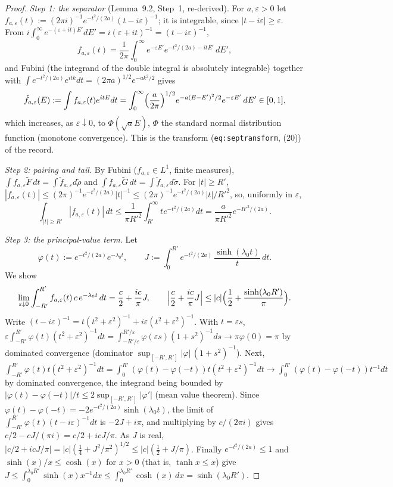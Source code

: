 \documentclass[11pt,a4paper]{article}
\newcommand{\Ft}{\widetilde F}
\newcommand{\Gt}{\widetilde G}
\theoremstyle{plain}
\theoremstyle{definition}
\begin{document}
\begin{proof}
\emph{Step 1: the separator} (Lemma~9.2, Step~1, re-derived).  For $a,\varepsilon>0$ let
$f_{a,\varepsilon}(t):=(2\pi i)^{-1}e^{-t^2/(2a)}(t-i\varepsilon)^{-1}$; it is integrable, since
$|t-i\varepsilon|\ge\varepsilon$.  From $i\int_0^\infty e^{-(\varepsilon+it)E'}dE'=
i(\varepsilon+it)^{-1}=(t-i\varepsilon)^{-1}$,
\[
 f_{a,\varepsilon}(t)=\frac1{2\pi}\int_0^\infty e^{-\varepsilon E'}e^{-t^2/(2a)-itE'}\,dE' ,
\]
and Fubini (the integrand of the double integral is absolutely integrable) together with
$\int e^{-t^2/(2a)}e^{itk}dt=(2\pi a)^{1/2}e^{-ak^2/2}$ gives
\[
 \check f_{a,\varepsilon}(E):=\int f_{a,\varepsilon}(t)e^{itE}dt
 =\int_0^\infty\Bigl(\frac a{2\pi}\Bigr)^{1/2}e^{-a(E-E')^2/2}e^{-\varepsilon E'}\,dE'\in[0,1],
\]
which increases, as $\varepsilon\downarrow0$, to $\Phi(\sqrt aE)$, $\Phi$ the standard normal
distribution function (monotone convergence).  This is the transform (\texttt{eq:septransform},
(20)) of the record.

\emph{Step 2: pairing and tail.}  By Fubini ($f_{a,\varepsilon}\in L^1$, finite measures),
$\int f_{a,\varepsilon}\Ft\,dt=\int\check f_{a,\varepsilon}d\tilde\rho$ and
$\int f_{a,\varepsilon}\Gt\,dt=\int\check f_{a,\varepsilon}d\tilde\sigma$.  For $|t|\ge R'$,
$|f_{a,\varepsilon}(t)|\le(2\pi)^{-1}e^{-t^2/(2a)}|t|^{-1}\le(2\pi)^{-1}e^{-t^2/(2a)}|t|/R'^2$,
so, uniformly in $\varepsilon$,
\[
 \int_{|t|\ge R'}|f_{a,\varepsilon}(t)|\,dt\le\frac1{\pi R'^2}\int_{R'}^\infty te^{-t^2/(2a)}dt
 =\frac{a}{\pi R'^2}e^{-R'^2/(2a)} .
\]

\emph{Step 3: the principal-value term.}  Let
\[
 \varphi(t):=e^{-t^2/(2a)}e^{-\lambda_0t},\qquad
 J:=\int_0^{R'}e^{-t^2/(2a)}\,\frac{\sinh(\lambda_0t)}{t}\,dt .
\]
We show
\begin{equation}
 \lim_{\varepsilon\downarrow0}\int_{-R'}^{R'}f_{a,\varepsilon}(t)\,c\,e^{-\lambda_0t}\,dt
 =\frac c2+\frac{ic}{\pi}J,\qquad
 \Bigl|\frac c2+\frac{ic}\pi J\Bigr|\le|c|\Bigl(\frac12+\frac{\sinh(\lambda_0R')}{\pi}\Bigr).
 \label{eq:pv}
\end{equation}
Write $(t-i\varepsilon)^{-1}=t(t^2+\varepsilon^2)^{-1}+i\varepsilon(t^2+\varepsilon^2)^{-1}$.
With $t=\varepsilon s$, $\varepsilon\int_{-R'}^{R'}\varphi(t)(t^2+\varepsilon^2)^{-1}dt=
\int_{-R'/\varepsilon}^{R'/\varepsilon}\varphi(\varepsilon s)(1+s^2)^{-1}ds\to\pi\varphi(0)=\pi$
by dominated convergence (dominator $\sup_{[-R',R']}|\varphi|\,(1+s^2)^{-1}$).  Next,
$\int_{-R'}^{R'}\varphi(t)t(t^2+\varepsilon^2)^{-1}dt=\int_0^{R'}(\varphi(t)-\varphi(-t))
t(t^2+\varepsilon^2)^{-1}dt\to\int_0^{R'}(\varphi(t)-\varphi(-t))t^{-1}dt$ by dominated
convergence, the integrand being bounded by $|\varphi(t)-\varphi(-t)|/t\le2\sup_{[-R',R']}
|\varphi'|$ (mean value theorem).  Since $\varphi(t)-\varphi(-t)=-2e^{-t^2/(2a)}\sinh(\lambda_0t)$,
the limit of $\int_{-R'}^{R'}\varphi(t)(t-i\varepsilon)^{-1}dt$ is $-2J+i\pi$, and multiplying by
$c/(2\pi i)$ gives $c/2-cJ/(\pi i)=c/2+icJ/\pi$.  As $J$ is real,
$|c/2+icJ/\pi|=|c|(\frac14+J^2/\pi^2)^{1/2}\le|c|(\frac12+J/\pi)$.  Finally
$e^{-t^2/(2a)}\le1$ and $\sinh(x)/x\le\cosh(x)$ for $x>0$ (that is, $\tanh x\le x$) give
$J\le\int_0^{\lambda_0R'}\sinh(x)x^{-1}dx\le\int_0^{\lambda_0R'}\cosh(x)\,dx=\sinh(\lambda_0R')$.


\end{proof}
\end{document}
